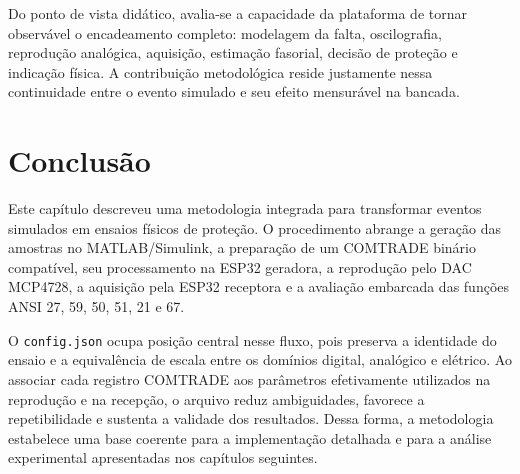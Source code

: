 Do ponto de vista didático, avalia-se a capacidade da plataforma de tornar observável o encadeamento completo: modelagem da falta, oscilografia, reprodução analógica, aquisição, estimação fasorial, decisão de proteção e indicação física. A contribuição metodológica reside justamente nessa continuidade entre o evento simulado e seu efeito mensurável na bancada.

\section{Conclusão}

Este capítulo descreveu uma metodologia integrada para transformar eventos simulados em ensaios físicos de proteção. O procedimento abrange a geração das amostras no MATLAB/Simulink, a preparação de um COMTRADE binário compatível, seu processamento na ESP32 geradora, a reprodução pelo DAC MCP4728, a aquisição pela ESP32 receptora e a avaliação embarcada das funções ANSI 27, 59, 50, 51, 21 e 67.

O \texttt{config.json} ocupa posição central nesse fluxo, pois preserva a identidade do ensaio e a equivalência de escala entre os domínios digital, analógico e elétrico. Ao associar cada registro COMTRADE aos parâmetros efetivamente utilizados na reprodução e na recepção, o arquivo reduz ambiguidades, favorece a repetibilidade e sustenta a validade dos resultados. Dessa forma, a metodologia estabelece uma base coerente para a implementação detalhada e para a análise experimental apresentadas nos capítulos seguintes.

